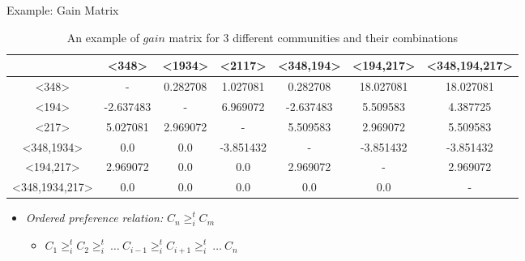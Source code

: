 \documentclass{beamer}
\begin{document}
\begin{frame}{Example: Gain Matrix}
    \begin{table}[ht]
        \tiny
        \caption{An example of $gain$ matrix for 3 different communities and their combinations} %
        \centering %
        {\renewcommand{\arraystretch}{1.2}
        \begin{tabular}{c|c c c c c c} %
        \hline\hline %
         & \textless348\textgreater & \textless1934\textgreater & \textless2117\textgreater & \textless348,194\textgreater & \textless194,217\textgreater & \textless348,194,217\textgreater \\ [0.5ex] %
        \hline %
        \textless348\textgreater & - & 0.282708 & 1.027081 & 0.282708 & 18.027081 & 18.027081 \\
        \textless194\textgreater & -2.637483 & - & 6.969072 & -2.637483 & 5.509583 & 4.387725 \\
        \textless217\textgreater & 5.027081 & 2.969072 & - & 5.509583 & 2.969072 & 5.509583 \\
        \textless348,1934\textgreater & 0.0 & 0.0 & -3.851432 & - & -3.851432 & -3.851432 \\
        \textless194,217\textgreater & 2.969072 & 0.0 & 0.0 & 2.969072 & - & 2.969072 \\
        \textless348,1934,217\textgreater & 0.0 & 0.0 & 0.0 & 0.0 & 0.0 & - \\ [1ex] %
        \hline %
        \end{tabular}
        }
        \label{table:nonlin} %
    \end{table}

    \footnotesize
    \begin{itemize}
        \item \emph{Ordered preference relation:} {\color{blue}$C_n \geq_{i}^t C_m$}
        \begin{itemize}
            \item $C_1 \geq_{i}^t C_2 \geq_{i}^t ~\dots~ C_{i-1} \geq_{i}^t C_{i+1} \geq_{i}^t ~\dots~ C_n$
        \end{itemize}
    \end{itemize}

\end{frame}
\end{document}
